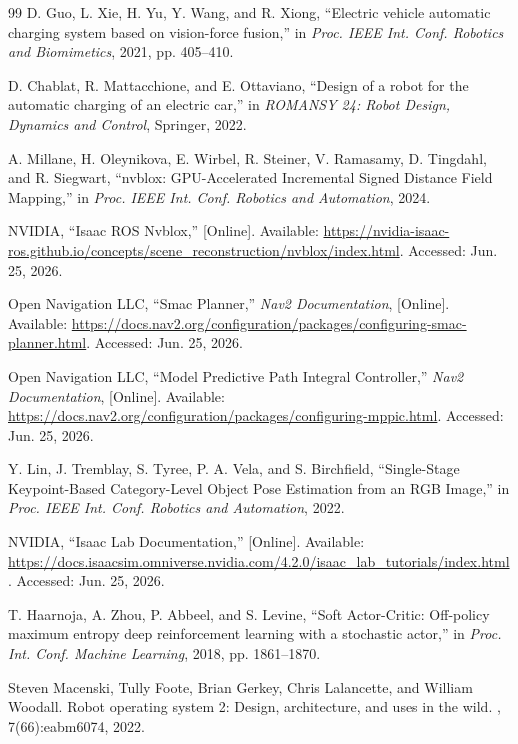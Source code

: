 \documentclass[10pt]{article}
\begin{document}
\begin{thebibliography}{99}
D. Guo, L. Xie, H. Yu, Y. Wang, and R. Xiong, ``Electric vehicle automatic charging system based on vision-force fusion,'' in \emph{Proc. IEEE Int. Conf. Robotics and Biomimetics}, 2021, pp. 405--410.

D. Chablat, R. Mattacchione, and E. Ottaviano, ``Design of a robot for the automatic charging of an electric car,'' in \emph{ROMANSY 24: Robot Design, Dynamics and Control}, Springer, 2022.

A. Millane, H. Oleynikova, E. Wirbel, R. Steiner, V. Ramasamy, D. Tingdahl, and R. Siegwart, ``nvblox: GPU-Accelerated Incremental Signed Distance Field Mapping,'' in \emph{Proc. IEEE Int. Conf. Robotics and Automation}, 2024.

NVIDIA, ``Isaac ROS Nvblox,'' [Online]. Available: \url{https://nvidia-isaac-ros.github.io/concepts/scene_reconstruction/nvblox/index.html}. Accessed: Jun. 25, 2026.

Open Navigation LLC, ``Smac Planner,'' \emph{Nav2 Documentation}, [Online]. Available: \url{https://docs.nav2.org/configuration/packages/configuring-smac-planner.html}. Accessed: Jun. 25, 2026.

Open Navigation LLC, ``Model Predictive Path Integral Controller,'' \emph{Nav2 Documentation}, [Online]. Available: \url{https://docs.nav2.org/configuration/packages/configuring-mppic.html}. Accessed: Jun. 25, 2026.

Y. Lin, J. Tremblay, S. Tyree, P. A. Vela, and S. Birchfield, ``Single-Stage Keypoint-Based Category-Level Object Pose Estimation from an RGB Image,'' in \emph{Proc. IEEE Int. Conf. Robotics and Automation}, 2022.

NVIDIA, ``Isaac Lab Documentation,'' [Online]. Available: \url{https://docs.isaacsim.omniverse.nvidia.com/4.2.0/isaac_lab_tutorials/index.html}. Accessed: Jun. 25, 2026.

T. Haarnoja, A. Zhou, P. Abbeel, and S. Levine, ``Soft Actor-Critic: Off-policy maximum entropy deep reinforcement learning with a stochastic actor,'' in \emph{Proc. Int. Conf. Machine Learning}, 2018, pp. 1861--1870.

Steven Macenski, Tully Foote, Brian Gerkey, Chris Lalancette, and William
  Woodall.
\newblock Robot operating system 2: Design, architecture, and uses in the wild.
, 7(66):eabm6074, 2022.


\end{thebibliography}
\end{document}
